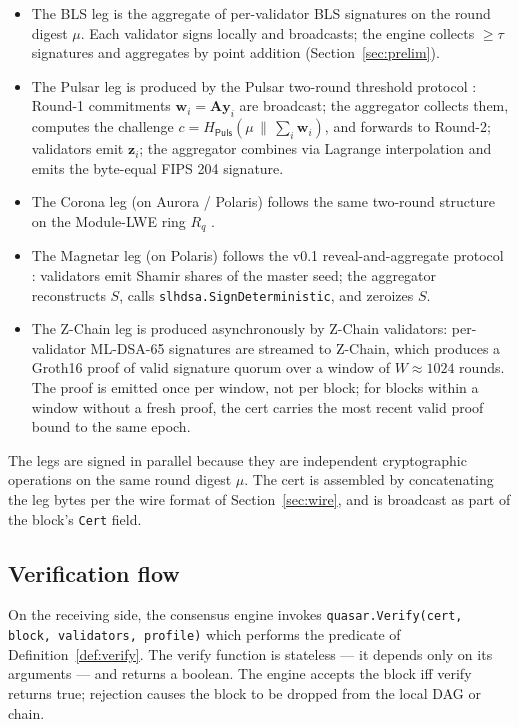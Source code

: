 \begin{itemize}[leftmargin=2em,nosep]
\item The BLS leg is the aggregate of per-validator BLS signatures
      on the round digest $\mu$. Each validator signs locally and
      broadcasts; the engine collects $\geq \tau$ signatures and
      aggregates by point addition (Section~\ref{sec:prelim}).
\item The Pulsar leg is produced by the Pulsar two-round threshold
      protocol \cite{pulsar}: Round-1 commitments
      $\mathbf{w}_i = \mathbf{A}\mathbf{y}_i$ are broadcast; the
      aggregator collects them, computes the challenge $c =
      H_{\mathsf{Puls}}(\mu \,\|\, \sum_i \mathbf{w}_i)$, and
      forwards to Round-2; validators emit $\mathbf{z}_i$; the
      aggregator combines via Lagrange interpolation and emits the
      byte-equal FIPS 204 signature.
\item The Corona leg (on Aurora / Polaris) follows the same
      two-round structure on the Module-LWE ring $R_q$
      \cite{corona,ringtail}.
\item The Magnetar leg (on Polaris) follows the v0.1 reveal-and-aggregate
      protocol \cite{magnetar}: validators emit Shamir shares of
      the master seed; the aggregator reconstructs $S$, calls
      \texttt{slhdsa.SignDeterministic}, and zeroizes $S$.
\item The Z-Chain leg is produced asynchronously by Z-Chain validators:
      per-validator ML-DSA-65 signatures are streamed to Z-Chain,
      which produces a Groth16 proof of valid signature quorum over a
      window of $W \approx 1024$ rounds. The proof is emitted once
      per window, not per block; for blocks within a window without
      a fresh proof, the cert carries the most recent valid proof
      bound to the same epoch.
\end{itemize}

The legs are signed in parallel because they are independent
cryptographic operations on the same round digest $\mu$. The cert is
assembled by concatenating the leg bytes per the wire format of
Section~\ref{sec:wire}, and is broadcast as part of the block's
\texttt{Cert} field.

\subsection{Verification flow}

On the receiving side, the consensus engine invokes
\texttt{quasar.Verify(cert, block, validators, profile)} which
performs the predicate of Definition~\ref{def:verify}. The verify
function is stateless --- it depends only on its arguments --- and
returns a boolean. The engine accepts the block iff verify returns
true; rejection causes the block to be dropped from the local DAG
or chain.

